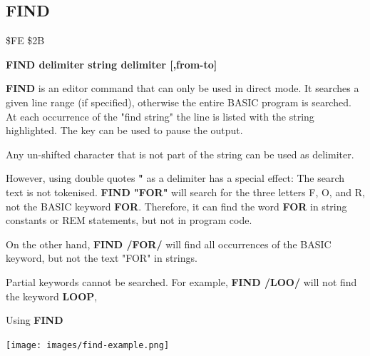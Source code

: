 \subsection{FIND}
\begin{description}[leftmargin=2cm,style=nextline]
\item [Token:] \$FE \$2B
\item [Format:] {\bf FIND {\bf delimiter} string {\bf delimiter} [,from-to]}
\item [Usage:]  {\bf FIND} is an editor command that can only be used
                in direct mode. It searches a given line range
                (if specified), otherwise the entire BASIC program is searched.
                At each occurrence of the "find string" the line is
                listed with the string highlighted.
                The  key can be used to pause the output.

\item [Remarks:] Any un-shifted character that is not part of
                 the string can be used as delimiter.

                 However, using double quotes {\bf "} as a delimiter has a special effect:
                 The search text is not tokenised.
                 {\bf FIND "FOR"} will search for the three letters F, O, and R, not
                 the BASIC keyword {\bf FOR}. Therefore, it can find the word
                 {\bf FOR} in string constants or REM statements, but not
                 in program code.

                 On the other hand, {\bf FIND /FOR/} will find all occurrences of
                 the BASIC keyword, but not the text "FOR" in strings.

                 Partial keywords cannot be searched. For example,
                 {\bf FIND /LOO/} will not find the keyword {\bf LOOP},


\item [Example:] Using {\bf FIND}
\item \begin{center}\texttt{[image: images/find-example.png]}\end{center}
\end{description}


\newpage
